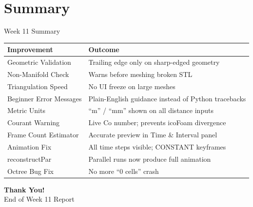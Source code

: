 \documentclass[dvipsnames,mathserif]{beamer}
\begin{document}
\section{Summary}
\begin{frame}{Week 11 Summary}
    \begin{center}
        \small
        \begin{tabular}{p{4.2cm}p{5.8cm}}
            \toprule
            \textbf{Improvement} & \textbf{Outcome} \\
            \midrule
            Geometric Validation & Trailing edge only on sharp-edged geometry \\
            Non-Manifold Check & Warns before meshing broken STL \\
            Triangulation Speed & No UI freeze on large meshes \\
            Beginner Error Messages & Plain-English guidance instead of Python tracebacks \\
            Metric Units & ``m'' / ``mm'' shown on all distance inputs \\
            Courant Warning & Live Co number; prevents icoFoam divergence \\
            Frame Count Estimator & Accurate preview in Time \& Interval panel \\
            Animation Fix & All time steps visible; CONSTANT keyframes \\
            reconstructPar & Parallel runs now produce full animation \\
            Octree Bug Fix & No more ``0 cells'' crash \\
            \bottomrule
        \end{tabular}
    \end{center}
\end{frame}

\begin{frame}
    \begin{center}
        \Huge \textbf{Thank You!} \\
        \vspace{0.5cm}
        \large End of Week 11 Report
    \end{center}
\end{frame}
\end{document}
